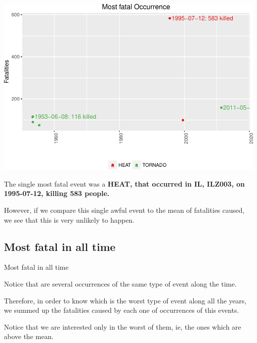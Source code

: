 \documentclass[]{article}
\begin{document}
\includegraphics{readme_files/figure-latex/fatal-plot-single-1.pdf}

The single most fatal event was a \textbf{HEAT, that occurred in IL,
ILZ003, on 1995-07-12, killing 583 people.}

However, if we compare this single awful event to the mean of fatalities
caused, we see that this is very unlikely to happen.

\subsection{Most fatal in all time}\label{most-fatal-in-all-time}

Most fatal in all time

Notice that are several occurrences of the same type of event along the
time.

Therefore, in order to know which is the worst type of event along all
the years, we summed up the fatalities caused by each one of occurrences
of this events.

Notice that we are interested only in the worst of them, ie, the ones
which are above the mean.
\end{document}
